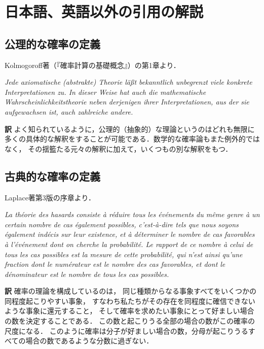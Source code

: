 \documentclass[main.tex]{subfiles}
\begin{document}
\chapter{日本語、英語以外の引用の解説}

\section{公理的な確率の定義}

Kolmogoroff著（『確率計算の基礎概念』）の第1章より．

\begin{quotebox}
\itshape
Jede axiomatische (abstrakte) Theorie läßt
bekanntlich unbegrenzt viele konkrete Interpretationen zu.
In dieser Weise hat auch die mathematische Wahrscheinlichkeitstheorie
neben derjenigen ihrer Interpretationen,
aus der sie aufgewachsen ist,
auch zahlreiche andere.
\end{quotebox}

\noindent \textbf{\gtfamily 訳} よく知られているように，公理的（抽象的）な理論というのはどれも無限に多くの具体的な解釈をすることが可能である．数学的な確率論もまた例外的ではなく，
その揺籃たる元々の解釈に加えて，いくつもの別な解釈をもつ．



\section{古典的な確率の定義}

Laplace著第3版の序章より．

\begin{quotebox}
\itshape
La théorie des hasards consiste à réduire tous les événements du même genre à un certain nombre
de cas également possibles, c'est-à-dire tels que nous soyons également indécis sur leur existence,
et à déterminer le nombre de cas favorables à l'événement dont on cherche la probabilité.
Le rapport de ce nombre à celui de tous les cas possibles est la mesure de cette probabilité,
qui n'est ainsi qu'une fraction dont le numérateur est le nombre des cas favorables,
et dont le dénominateur est le nombre de tous les cas possibles.
\end{quotebox}

\noindent \textbf{\gtfamily 訳} 確率の理論を構成しているのは，
同じ種類からなる事象すべてをいくつかの同程度起こりやすい事象，
すなわち私たちがその存在を同程度に確信できないような事象に還元すること，
そして確率を求めたい事象にとって好ましい場合の数を決定することである．
この数と起こりうる全部の場合の数がこの確率の尺度になる．
このように確率は分子が好ましい場合の数，分母が起こりうるすべての場合の数であるような分数に過ぎない．


\end{document}
